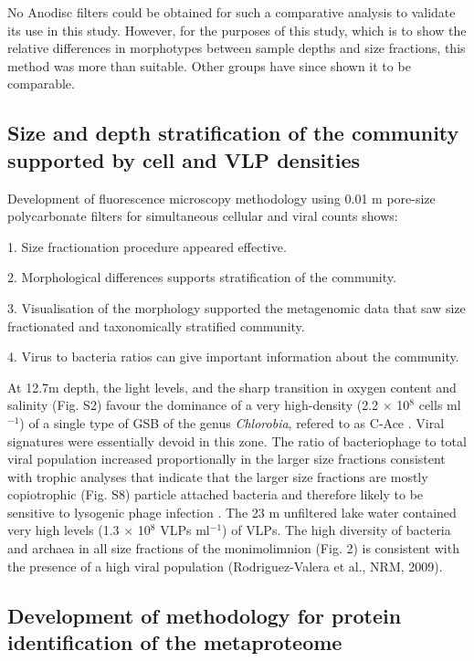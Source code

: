 
No Anodisc filters could be obtained for such a comparative analysis to validate its use in this study.
However, for the purposes of this study, which is to show the relative differences in morphotypes between sample depths and size fractions, this method was more than suitable.
Other groups have since shown it to be comparable. %


\subsection[Community stratification supported by cell and \ac{VLP} densities]{Size and depth stratification of the community supported by cell and \ac{VLP} densities}
Development of fluorescence microscopy methodology using 0.01 \textmu{}m pore-size polycarbonate filters for simultaneous cellular and viral counts shows:

1. Size fractionation procedure appeared effective.

2. Morphological differences supports stratification of the community.

3. Visualisation of the morphology supported the metagenomic data that saw size fractionated and taxonomically stratified community.

4. Virus to bacteria ratios can give important information about the community.

At 12.7m depth, the light levels, and the sharp transition in oxygen content and salinity (Fig. S2) favour the dominance of a very high-density (2.2 $\times$ 10$^8$ cells ml$^{-1}$) of a single type of \ac{GSB} of the genus \emph{Chlorobia}, refered to as C-Ace \cite{Ng2010a}. 
Viral signatures were essentially devoid in this zone. 
The ratio of bacteriophage to total viral population increased proportionally in the larger size fractions consistent with trophic analyses that indicate that the larger size fractions are mostly copiotrophic (Fig. S8) particle attached bacteria and therefore likely to be sensitive to lysogenic phage infection \cite{Lauro2009}. 
The 23 m unfiltered lake water contained very high levels (1.3 $\times$ 10$^8$ \acp{VLP} ml$^{-1}$) of \acp{VLP}. 
The high diversity of bacteria and archaea in all size fractions of the monimolimnion (Fig. 2) is consistent with the presence of a high viral population (Rodriguez-Valera et al., NRM, 2009).


\subsection[Development of methodology for protein identification of the metaproteome]{Development of methodology for protein identification of the metaproteome}

